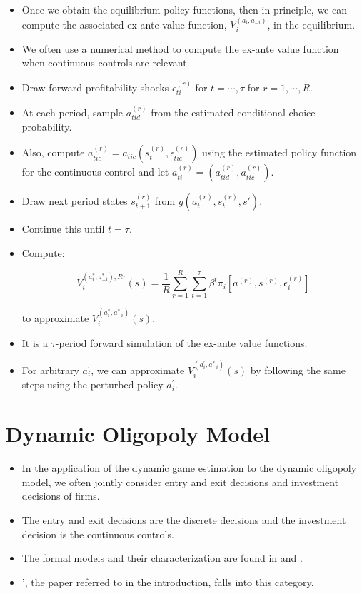 \documentclass[]{book}
\providecommand{\tightlist}{%
  \setlength{\itemsep}{0pt}\setlength{\parskip}{0pt}}
\begin{document}
\begin{itemize}
\tightlist
\item
  Once we obtain the equilibrium policy functions, then in principle, we
  can compute the associated ex-ante value function,
  \(V_i^{(a_i, a_{-i})}\), in the equilibrium.
\item
  We often use a numerical method to compute the ex-ante value function
  when continuous controls are relevant.
\item
  Draw forward profitability shocks \(\epsilon_{ti}^{(r)}\) for
  \(t = \cdots, \tau\) for \(r = 1, \cdots, R\).
\item
  At each period, sample \(a_{tid}^{(r)}\) from the estimated
  conditional choice probability.
\item
  Also, compute
  \(a_{tic}^{(r)} = a_{tic}(s_t^{(r)}, \epsilon_{tic}^{(r)})\) using the
  estimated policy function for the continuous control and let
  \(a_{ti}^{(r)} = (a_{tid}^{(r)}, a_{tic}^{(r)})\).
\item
  Draw next period states \(s_{t + 1}^{(r)}\) from
  \(g(a_{t}^{(r)}, s_t^{(r)}, s')\).
\item
  Continue this until \(t = \tau\).
\item
  Compute:

  \begin{equation}
  V_i^{(a_i^*, a_{-i}^*), R\tau}(s) = \frac{1}{R}\sum_{r = 1}^R \sum_{t = 1}^\tau \beta^t \pi_i[a^{(r)}, s^{(r)}, \epsilon_i^{(r)}]
  \end{equation}

  to approximate \(V_i^{(a_i^*, a_{-i}^*)}(s)\).
\item
  It is a \(\tau\)-period forward simulation of the ex-ante value
  functions.
\item
  For arbitrary \(a_i^{\prime}\), we can approximate
  \(V_i^{(a_i^{\prime}, a_{-i}^*)}(s)\) by following the same steps
  using the perturbed policy \(a_i^{\prime}\).
\end{itemize}

\section{Dynamic Oligopoly Model}\label{dynamic-oligopoly-model}

\begin{itemize}
\tightlist
\item
  In the application of the dynamic game estimation to the dynamic
  oligopoly model, we often jointly consider entry and exit decisions
  and investment decisions of firms.
\item
  The entry and exit decisions are the discrete decisions and the
  investment decision is the continuous controls.
\item
  The formal models and their characterization are found in
  \citet{ericsonMarkovPerfectIndustryDynamics1995} and
  \citet{doraszelskiComputableMarkovperfectIndustry2010}.
\item
  \citet{Igami2018}', the paper referred to in the introduction, falls
  into this category.
\end{itemize}
\end{document}
